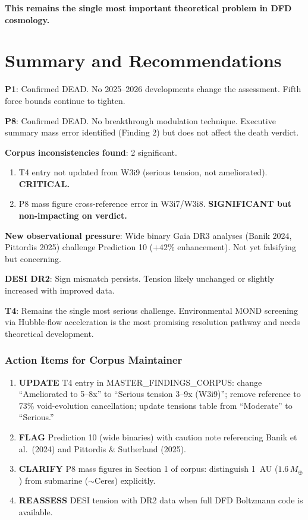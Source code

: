 \documentclass[11pt]{article}
\begin{document}
\textbf{This remains the single most important theoretical problem
in DFD cosmology.}


\part{Summary and Recommendations}

\begin{tcolorbox}[colback=green!5!white, colframe=green!60!black,
  title=\textbf{W4i10 Summary}]

\textbf{P1}: Confirmed DEAD. No 2025--2026 developments change the
assessment. Fifth force bounds continue to tighten.

\textbf{P8}: Confirmed DEAD. No breakthrough modulation technique.
Executive summary mass error identified (Finding 2) but does not
affect the death verdict.

\textbf{Corpus inconsistencies found}: 2 significant.
\begin{enumerate}[nosep]
\item T4 entry not updated from W3i9 (serious tension, not
  ameliorated). \textbf{CRITICAL.}
\item P8 mass figure cross-reference error in W3i7/W3i8.
  \textbf{SIGNIFICANT but non-impacting on verdict.}
\end{enumerate}

\textbf{New observational pressure}: Wide binary Gaia DR3 analyses
(Banik 2024, Pittordis 2025) challenge Prediction 10 ($+42\%$
enhancement). Not yet falsifying but concerning.

\textbf{DESI DR2}: Sign mismatch persists. Tension likely unchanged
or slightly increased with improved data.

\textbf{T4}: Remains the single most serious challenge. Environmental
MOND screening via Hubble-flow acceleration is the most promising
resolution pathway and needs theoretical development.
\end{tcolorbox}


\section*{Action Items for Corpus Maintainer}

\begin{enumerate}
\item \textbf{UPDATE} T4 entry in MASTER\_FINDINGS\_CORPUS: change
  ``Ameliorated to 5--8x'' to ``Serious tension 3--9x (W3i9)'';
  remove reference to 73\% void-evolution cancellation; update
  tensions table from ``Moderate'' to ``Serious.''
\item \textbf{FLAG} Prediction 10 (wide binaries) with caution note
  referencing Banik et al.\ (2024) and Pittordis \& Sutherland (2025).
\item \textbf{CLARIFY} P8 mass figures in Section 1 of corpus:
  distinguish 1~AU ($1.6\,M_\oplus$) from submarine ($\sim$Ceres)
  explicitly.
\item \textbf{REASSESS} DESI tension with DR2 data when full DFD
  Boltzmann code is available.
\end{enumerate}
\end{document}
